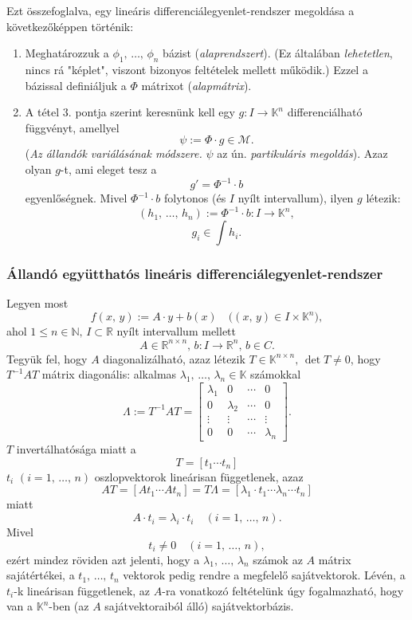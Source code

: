 \documentclass{article}
\newcommand{\R}{\mathbb{R}}
\newcommand{\N}{\mathbb{N}}
\newcommand{\K}{\mathbb{K}}
\begin{document}
	Ezt összefoglalva, egy lineáris differenciálegyenlet-rendszer megoldása a következőképpen történik:
	\begin{enumerate}
		\item Meghatározzuk a $\phi_1, \, \dots, \, \phi_n$ bázist (\textit{alaprendszert}). (Ez általában \textit{lehetetlen}, nincs rá "képlet", viszont bizonyos feltételek mellett működik.) Ezzel a bázissal definiáljuk a $\Phi$ mátrixot (\textit{alapmátrix}).
		\item A tétel 3. pontja szerint keresnünk kell egy $g : I \to \K^n$ differenciálható függvényt, amellyel
		\[
			\psi := \Phi \cdot g \in \mathcal{M}.
		\]
		(\textit{Az állandók variálásának módszere.} $\psi$ az ún. \textit{partikuláris megoldás}). Azaz olyan $g$-t, ami eleget tesz a
		\[
			g' = \Phi^{-1} \cdot b
		\]
		egyenlőségnek. Mivel $\Phi^{-1} \cdot b$ folytonos (és $I$ nyílt intervallum), ilyen $g$ létezik:
		\[	
			(h_1, \, \dots, \, h_n) := \Phi^{-1} \cdot b : I \to \K^n,
		\]
		\[
			g_i \in \int h_i.
		\]	
	\end{enumerate}
	
	\subsubsection{Állandó együtthatós lineáris differenciálegyenlet-rendszer}
	Legyen most
	\[
		f(x, \, y) := A \cdot y + b(x) \quad \big( (x, \, y) \in I \times \K^n \big),
	\]
	ahol $1 \leq n \in \N, \, I \subset \R$ nyílt intervallum mellett
	\[
		A \in \R^{n \times n}, \, b : I \to \R^n, \, b \in C.
	\]
	Tegyük fel, hogy $A$ diagonalizálható, azaz létezik $T \in \K^{n \times n}, \, \det T \neq 0$, hogy $T^{-1}AT$ mátrix diagonális: alkalmas $\lambda_1, \, \dots, \, \lambda_n \in \K$ számokkal
	\[
		\Lambda := T^{-1}AT = \begin{bmatrix}
			\lambda_1 & 0 & \cdots & 0 \\
			0 & \lambda_2 & \cdots & 0 \\
			\vdots & \vdots & \cdots & \vdots \\
			0 & 0 & \cdots & \lambda_n
		\end{bmatrix}.
	\]
	$T$ invertálhatósága miatt a
	\[
		 T = [t_1 \cdots t_n]
	\]
	$t_i$ $(i=1, \, \dots, \, n)$ oszlopvektorok lineárisan függetlenek, azaz
	\[
		AT = [At_1 \cdots At_n] = T\Lambda = [\lambda_1 \cdot t_1 \cdots \lambda_n \cdots t_n]
	\]
	miatt
	\[
		A \cdot t_i = \lambda_i \cdot t_i \quad (i = 1, \, \dots, \, n).
	\]
	Mivel
	\[
		t_i \neq 0 \quad (i = 1, \, \dots, \, n),
	\]
	ezért mindez röviden azt jelenti, hogy a $\lambda_1, \, \dots, \, \lambda_n$ számok az $A$ mátrix sajátértékei, a $t_1, \, \dots, \, t_n$ vektorok pedig rendre a megfelelő sajátvektorok. Lévén, a $t_i$-k lineárisan függetlenek, az $A$-ra vonatkozó feltételünk úgy fogalmazható, hogy van a $\K^n$-ben (az $A$ sajátvektoraiból álló) sajátvektorbázis.\\
	
\end{document}
